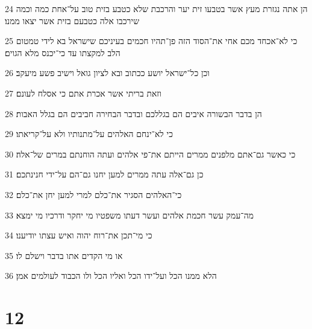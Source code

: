 \par 24 הן אתה נגזרת מעץ אשר בטבעו זית יער והרכבת שלא כטבע בזית טוב על־אחת כמה וכמה שירכבו אלה כטבעם בזית אשר יצאו ממנו׃
\par 25 כי לא־אכחד מכם אחי את־הסוד הזה פן־תהיו חכמים בעיניכם שישראל בא לידי טמטום הלב למקצתו עד כי־יכנס מלא הגוים׃
\par 26 וכן כל־ישראל יושע ככתוב ובא לציון גואל וישיב פשע מיעקב׃
\par 27 וזאת בריתי אשר אכרת אתם כי אסלח לעונם׃
\par 28 הן בדבר הבשורה איבים הם בגללכם ובדבר הבחירה חביבים הם בגלל האבות׃
\par 29 כי לא־ינחם האלהים על־מתנותיו ולא על־קריאתו׃
\par 30 כי כאשר גם־אתם מלפנים ממרים הייתם את־פי אלהים ועתה הוחנתם במרים של־אלה׃
\par 31 כן גם־אלה עתה ממרים למען יחנו גם־הם על־ידי חנינתכם׃
\par 32 כי־האלהים הסגיר את־כלם למרי למען יחן את־כלם׃
\par 33 מה־עמק עשר חכמת אלהים ועשר דעתו משפטיו מי יחקר ודרכיו מי ימצא׃
\par 34 כי מי־תכן את־רוח יהוה ואיש עצתו יודיענו׃
\par 35 או מי הקדים אתו בדבר וישלם לו׃
\par 36 הלא ממנו הכל ועל־ידו הכל ואליו הכל ולו הכבוד לעולמים אמן׃

\chapter{12}

